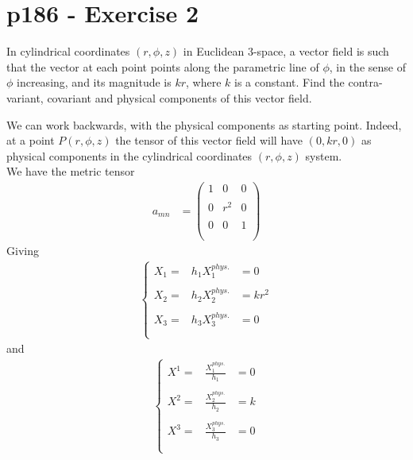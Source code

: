 \section{p186 - Exercise 2}
\begin{tcolorbox}
In cylindrical coordinates $\left(r, \phi,z\right)$ in Euclidean $3$-space, a vector field is such that the vector at each point points along the parametric line of $\phi$, in the sense of $\phi$ increasing, and its magnitude is $kr$, where $k$ is a constant. Find the contra-variant, covariant and physical components of this vector field.
\end{tcolorbox}
We can work backwards, with the physical components as starting point. Indeed, at a point $P\left(r,\phi,z\right)$ the tensor of this vector field will have $\left(0,kr,0\right)$ as physical components in the cylindrical coordinates $\left( r, \phi,z \right)$ system.\\
We have the metric tensor 
\begin{align}
a_{mn} &= \begin{pmatrix}
1&0&0\\\\
0&r^2&0\\\\
0&0&1\\\\
\end{pmatrix}
\end{align}
Giving
\begin{align}
\left\{\begin{array}{lll}
X_1 = &h_1 X_{1}^{phys.}&=0\\\\
X_2 = &h_2 X_{2}^{phys.}&=kr^2\\\\
X_3 = &h_3 X_{3}^{phys.}&=0\\\\
\end{array}\right.
\end{align}
and 
\begin{align}
\left\{\begin{array}{lll}
X^1 = &\frac {X_{1}^{phys.}}{h_1}&=0\\\\
X^2 = &\frac {X_{2}^{phys.}}{h_2}&=k\\\\
X^3 = &\frac {X_{3}^{phys.}}{h_3}&=0\\\\
\end{array}\right.
\end{align}

